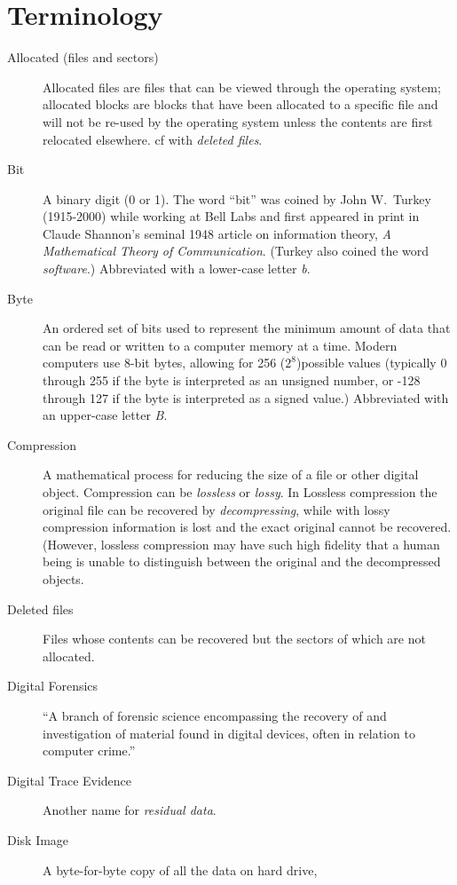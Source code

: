 \section{Terminology}
\begin{description}
\item[Allocated (files and sectors)] Allocated files are files that can be viewed through
  the operating system; allocated blocks are blocks that have been
  allocated to a specific file and will not be re-used by the
  operating system unless the contents are first relocated
  elsewhere. cf with \emph{deleted files}.
\item[Bit] A binary digit (0 or 1). The word ``bit'' was coined by
  John W.\ Turkey (1915-2000) while working at Bell Labs and first appeared in
  print in Claude Shannon's seminal 1948 article on information
  theory, \emph{A Mathematical Theory of Communication}. (Turkey also
  coined the word \emph{software}.) Abbreviated with a lower-case
  letter \emph{b}.
\item[Byte] An ordered set of bits used to represent the minimum
  amount of data that can be read or written to a computer memory at a
  time. Modern computers use 8-bit bytes, allowing for 256
  ($2^8$)possible values (typically 0 through 255 if the byte is
  interpreted as an unsigned number, or -128 through 127 if the byte
  is interpreted as a signed value.) Abbreviated with an upper-case
  letter \emph{B}.
\item[Compression] A mathematical process for reducing the size of a
  file or other digital object. Compression can be \emph{lossless} or
  \emph{lossy}. In Lossless compression the original file can be recovered by
  \emph{decompressing}, while with lossy compression information is
  lost and the exact original cannot be recovered. (However, lossless
  compression may have such high fidelity that a human being is unable
  to distinguish between the original and the decompressed objects.
\item[Deleted files] Files whose contents can be recovered but the
  sectors of which are not allocated.
\item[Digital Forensics] ``A branch of forensic science encompassing the
  recovery of and investigation of material
  found in digital devices, often in relation to computer crime.''\cite{reith:examination}
\item[Digital Trace Evidence] Another name for \emph{residual data}.
\item[Disk Image] A byte-for-byte copy of all the data on hard drive,

\end{description}
